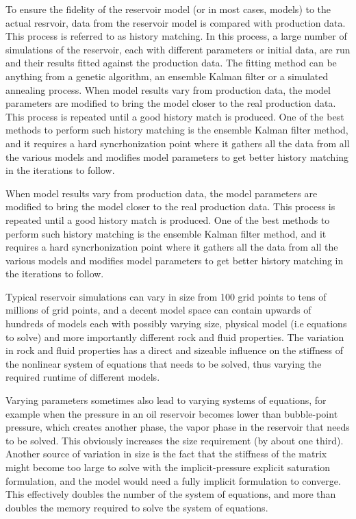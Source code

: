 \documentclass[conference,final]{IEEEtran}
\begin{document}
To ensure the fidelity of the reservoir model (or in most cases,
models) to the actual resrvoir, data from the reservoir model is
compared with production data. This process is referred to as
history matching. In this process, a large number of simulations of
the reservoir, each with different parameters or initial data, are
run and their results fitted against the production data. The
fitting method can be anything from a genetic algorithm, an ensemble
Kalman filter or a simulated annealing process. When model results
vary from production data, the model parameters are modified to bring
the model closer to the real production data. This process is repeated
until a good history match is produced. One of the best methods to perform
such history matching is the ensemble Kalman filter method, and it requires
a hard syncrhonization point where it gathers all the data from all the various
models and modifies model parameters to get better history matching in the
iterations to follow.

  When model results vary from production data, the model parameters
  are modified to bring the model closer to the real production data.
  This process is repeated until a good history match is produced. One
  of the best methods to perform such history matching is the ensemble
  Kalman filter method, and it requires a hard syncrhonization point
  where it gathers all the data from all the various models and
  modifies model parameters to get better history matching in the
  iterations to follow.

Typical reservoir simulations can vary in size from 100 grid points to
tens of millions of grid points, and a decent model space can contain
upwards of hundreds of models each with possibly varying size,
physical model (i.e equations to solve) and more importantly different
rock and fluid properties.  The variation in rock and fluid properties
has a direct and sizeable influence on the stiffness of the nonlinear
system of equations that needs to be solved, thus varying the required
runtime of different models.

Varying parameters sometimes also lead to varying systems of equations,
for example when the pressure in an oil reservoir becomes lower than
bubble-point pressure, which creates another phase, the vapor phase 
in the reservoir that needs to be solved. This obviously increases the size
requirement (by about one third). Another source of variation in size
is the fact that the stiffness of the matrix might become too large to solve
with the implicit-pressure explicit saturation formulation, and the model
would need a fully implicit formulation to converge. This effectively doubles
the number of the system of equations, and more than doubles the memory
required to solve the system of equations.
\end{document}
